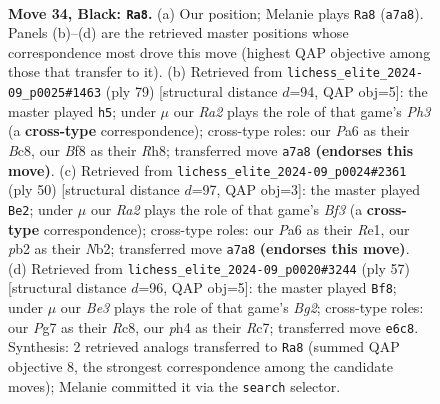 \documentclass[11pt]{article}
\begin{document}
\clearpage

\begin{figure}[p]\centering
\begin{subfigure}{0.46\textwidth}\centering
\resizebox{\linewidth}{!}{%
\newchessgame
\chessboard[
  setfen={1k3b2/rp4pr/p1p1b2p/P4p2/2pP3P/2B1P3/1P1K1PPN/R6R b - - 3 34},
  showmover=false,
  pgfstyle=straightmove, color=movearrow, markmove={a7-a8}
]}
\caption{}
\end{subfigure}\hfill
\begin{subfigure}{0.46\textwidth}\centering
\resizebox{\linewidth}{!}{%
\newchessgame
\chessboard[
  setfen={2b4r/2r1pp2/p4k1p/2pP2p1/2P1B1P1/1P2R2P/P4PK1/4R3 b - - 0 40},
  showmover=false,
  pgfstyle=straightmove, color=movearrow, markmove={h6-h5}
]}
\caption{}
\end{subfigure}
\\[4pt]
\begin{subfigure}{0.46\textwidth}\centering
\resizebox{\linewidth}{!}{%
\newchessgame
\chessboard[
  setfen={2r1k2r/4bp2/3p1p2/pb2pP2/1p2P1P1/1P3B1p/PNPR3P/1K2R3 w k - 1 26},
  showmover=false,
  pgfstyle=straightmove, color=movearrow, markmove={f3-e2}
]}
\caption{}
\end{subfigure}\hfill
\begin{subfigure}{0.46\textwidth}\centering
\resizebox{\linewidth}{!}{%
\newchessgame
\chessboard[
  setfen={2r3k1/1pr2pbp/p3p1p1/P7/1P1pP3/N2P1P1P/R3K1P1/3R4 b - - 5 29},
  showmover=false,
  pgfstyle=straightmove, color=movearrow, markmove={g7-f8}
]}
\caption{}
\end{subfigure}
\caption{\textbf{Move 34, Black: \texttt{Ra8}.} (a) Our position; Melanie plays \texttt{Ra8} (\texttt{a7a8}). Panels (b)--(d) are the retrieved master positions whose correspondence most drove this move (highest QAP objective among those that transfer to it). (b) Retrieved from \texttt{lichess\_elite\_2024-09\_p0025\#1463} (ply 79) [structural distance $d$=94, QAP obj=5]: the master played \texttt{h5}; under $\mu$ our \emph{Ra2} plays the role of that game's \emph{Ph3} (a \textbf{cross-type} correspondence); cross-type roles: our \emph{P}a6 as their \emph{B}c8, our \emph{B}f8 as their \emph{R}h8; transferred move \texttt{a7a8} \textbf{(endorses this move)}. (c) Retrieved from \texttt{lichess\_elite\_2024-09\_p0024\#2361} (ply 50) [structural distance $d$=97, QAP obj=3]: the master played \texttt{Be2}; under $\mu$ our \emph{Ra2} plays the role of that game's \emph{Bf3} (a \textbf{cross-type} correspondence); cross-type roles: our \emph{P}a6 as their \emph{R}e1, our \emph{p}b2 as their \emph{N}b2; transferred move \texttt{a7a8} \textbf{(endorses this move)}. (d) Retrieved from \texttt{lichess\_elite\_2024-09\_p0020\#3244} (ply 57) [structural distance $d$=96, QAP obj=5]: the master played \texttt{Bf8}; under $\mu$ our \emph{Be3} plays the role of that game's \emph{Bg2}; cross-type roles: our \emph{P}g7 as their \emph{R}c8, our \emph{p}h4 as their \emph{R}c7; transferred move \texttt{e6c8}. Synthesis: 2 retrieved analogs transferred to \texttt{Ra8} (summed QAP objective 8, the strongest correspondence among the candidate moves); Melanie committed it via the \texttt{search} selector.}
\label{fig:thought-m67}
\end{figure}
\end{document}
